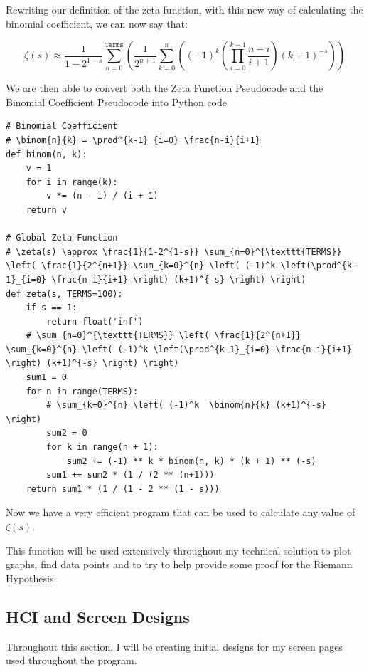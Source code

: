 \documentclass{article}
\begin{document}
Rewriting our definition of the zeta function, with this new way of calculating the binomial coefficient, we can now say that:

$$\zeta(s) \approx \frac{1}{1-2^{1-s}} \sum_{n=0}^{\texttt{Terms}} \left( \frac{1}{2^{n+1}} \sum_{k=0}^{n} \left( (-1)^k \left(\prod^{k-1}_{i=0} \frac{n-i}{i+1} \right) (k+1)^{-s} \right) \right)$$

\clearpage
We are then able to convert both the Zeta Function Pseudocode and the Binomial Coefficient Pseudocode into Python code
\begin{lstlisting}
# Binomial Coefficient
# \binom{n}{k} = \prod^{k-1}_{i=0} \frac{n-i}{i+1}
def binom(n, k):
    v = 1
    for i in range(k):
        v *= (n - i) / (i + 1)
    return v

# Global Zeta Function
# \zeta(s) \approx \frac{1}{1-2^{1-s}} \sum_{n=0}^{\texttt{TERMS}} \left( \frac{1}{2^{n+1}} \sum_{k=0}^{n} \left( (-1)^k \left(\prod^{k-1}_{i=0} \frac{n-i}{i+1} \right) (k+1)^{-s} \right) \right)
def zeta(s, TERMS=100):
    if s == 1:
        return float('inf')
    # \sum_{n=0}^{\texttt{TERMS}} \left( \frac{1}{2^{n+1}} \sum_{k=0}^{n} \left( (-1)^k \left(\prod^{k-1}_{i=0} \frac{n-i}{i+1} \right) (k+1)^{-s} \right) \right)
    sum1 = 0
    for n in range(TERMS):
        # \sum_{k=0}^{n} \left( (-1)^k  \binom{n}{k} (k+1)^{-s} \right)
        sum2 = 0
        for k in range(n + 1):
            sum2 += (-1) ** k * binom(n, k) * (k + 1) ** (-s)
        sum1 += sum2 * (1 / (2 ** (n+1)))
    return sum1 * (1 / (1 - 2 ** (1 - s)))
\end{lstlisting}

Now we have a very efficient program that can be used to calculate any value of $\zeta(s)$.

This function will be used extensively throughout my technical solution to plot graphs, find data points and to try to help provide some proof for the Riemann Hypothesis.


\clearpage

\subsection{HCI and Screen Designs}
Throughout this section, I will be creating initial designs for my screen pages used throughout the program.
\end{document}

